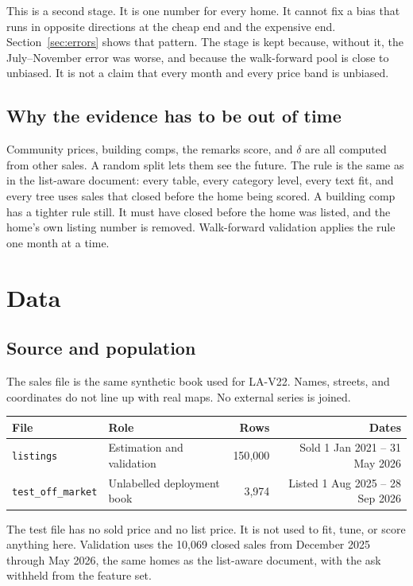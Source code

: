 \documentclass[11pt]{article}
\begin{document}
This is a second stage. It is one number for every home. It cannot fix a bias that runs in opposite directions at the cheap end and the expensive end. Section~\ref{sec:errors} shows that pattern. The stage is kept because, without it, the July--November error was worse, and because the walk-forward pool is close to unbiased. It is not a claim that every month and every price band is unbiased.

\subsection{Why the evidence has to be out of time}

Community prices, building comps, the remarks score, and \(\delta\) are all computed from other sales. A random split lets them see the future. The rule is the same as in the list-aware document: every table, every category level, every text fit, and every tree uses sales that closed before the home being scored. A building comp has a tighter rule still. It must have closed before the home was listed, and the home's own listing number is removed. Walk-forward validation applies the rule one month at a time.

\section{Data}
\label{sec:data}

\subsection{Source and population}

The sales file is the same synthetic book used for LA-V22. Names, streets, and coordinates do not line up with real maps. No external series is joined.

\begin{center}
\begin{tabular}{llrr}
\toprule
File & Role & Rows & Dates \\
\midrule
\texttt{listings} & Estimation and validation & 150{,}000 & Sold 1 Jan 2021 -- 31 May 2026 \\
\texttt{test\_off\_market} & Unlabelled deployment book & 3{,}974 & Listed 1 Aug 2025 -- 28 Sep 2026 \\
\bottomrule
\end{tabular}
\end{center}

The test file has no sold price and no list price. It is not used to fit, tune, or score anything here. Validation uses the 10,069 closed sales from December 2025 through May 2026, the same homes as the list-aware document, with the ask withheld from the feature set.
\end{document}
